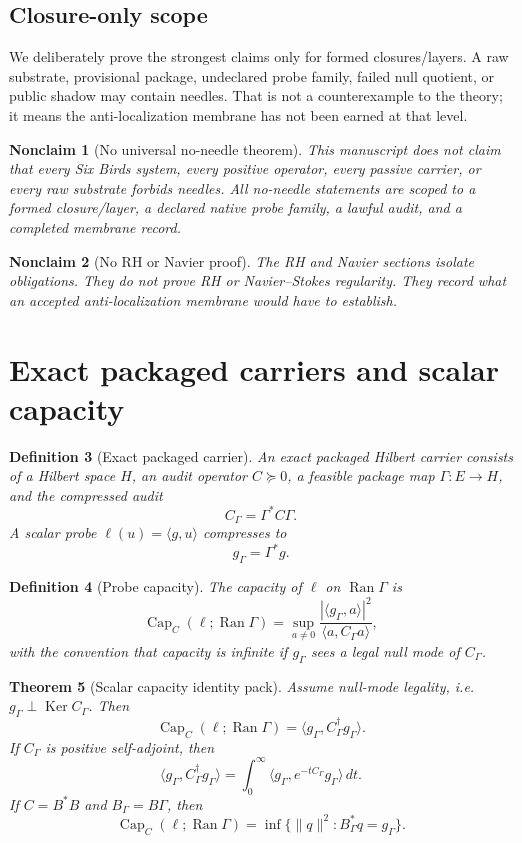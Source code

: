 \documentclass[11pt]{article}
\newtheorem{theorem}{Theorem}[section]
\newtheorem{definition}[theorem]{Definition}
\newtheorem{nonclaim}[theorem]{Nonclaim}
\DeclareMathOperator{\range}{Ran}
\DeclareMathOperator{\kernel}{Ker}
\DeclareMathOperator{\Capacity}{Cap}
\begin{document}
\subsection{Closure-only scope}
We deliberately prove the strongest claims only for formed closures/layers.  A raw substrate, provisional package, undeclared probe family, failed null quotient, or public shadow may contain needles.  That is not a counterexample to the theory; it means the anti-localization membrane has not been earned at that level.

\begin{nonclaim}[No universal no-needle theorem]
This manuscript does not claim that every Six Birds system, every positive operator, every passive carrier, or every raw substrate forbids needles.  All no-needle statements are scoped to a formed closure/layer, a declared native probe family, a lawful audit, and a completed membrane record.
\end{nonclaim}

\begin{nonclaim}[No RH or Navier proof]
The RH and Navier sections isolate obligations.  They do not prove RH or Navier--Stokes regularity.  They record what an accepted anti-localization membrane would have to establish.
\end{nonclaim}

\section{Exact packaged carriers and scalar capacity}

\begin{definition}[Exact packaged carrier]
An exact packaged Hilbert carrier consists of a Hilbert space \(H\), an audit operator \(C\succeq0\), a feasible package map \(\Gamma:E\to H\), and the compressed audit
\[
  C_\Gamma=\Gamma^*C\Gamma.
\]
A scalar probe \(\ell(u)=\langle g,u\rangle\) compresses to
\[
  g_\Gamma=\Gamma^*g.
\]
\end{definition}

\begin{definition}[Probe capacity]
The capacity of \(\ell\) on \(\range\Gamma\) is
\[
  \Capacity_C(\ell;\range\Gamma)
  =\sup_{a\ne0}\frac{|\langle g_\Gamma,a\rangle|^2}{\langle a,C_\Gamma a\rangle},
\]
with the convention that capacity is infinite if \(g_\Gamma\) sees a legal null mode of \(C_\Gamma\).
\end{definition}

\begin{theorem}[Scalar capacity identity pack]
Assume null-mode legality, i.e. \(g_\Gamma\perp\kernel C_\Gamma\).  Then
\[
  \Capacity_C(\ell;\range\Gamma)
  =\langle g_\Gamma,C_\Gamma^\dagger g_\Gamma\rangle.
\]
If \(C_\Gamma\) is positive self-adjoint, then
\[
  \langle g_\Gamma,C_\Gamma^\dagger g_\Gamma\rangle
  =\int_0^\infty \langle g_\Gamma,e^{-tC_\Gamma}g_\Gamma\rangle\,dt.
\]
If \(C=B^*B\) and \(B_\Gamma=B\Gamma\), then
\[
  \Capacity_C(\ell;\range\Gamma)
  =\inf\{\|q\|^2:B_\Gamma^*q=g_\Gamma\}.
\]
\end{theorem}
\end{document}
